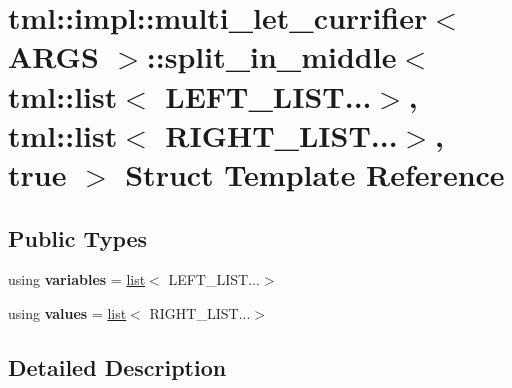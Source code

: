 \hypertarget{structtml_1_1impl_1_1multi__let__currifier_1_1split__in__middle_3_01tml_1_1list_3_01_l_e_f_t___ld9733f5c21967624b3111370412aab07}{\section{tml\+:\+:impl\+:\+:multi\+\_\+let\+\_\+currifier$<$ A\+R\+G\+S $>$\+:\+:split\+\_\+in\+\_\+middle$<$ tml\+:\+:list$<$ L\+E\+F\+T\+\_\+\+L\+I\+S\+T...$>$, tml\+:\+:list$<$ R\+I\+G\+H\+T\+\_\+\+L\+I\+S\+T...$>$, true $>$ Struct Template Reference}
\label{structtml_1_1impl_1_1multi__let__currifier_1_1split__in__middle_3_01tml_1_1list_3_01_l_e_f_t___ld9733f5c21967624b3111370412aab07}
}
\subsection*{Public Types}
\begin{DoxyCompactItemize}
\item 
\hypertarget{structtml_1_1impl_1_1multi__let__currifier_1_1split__in__middle_3_01tml_1_1list_3_01_l_e_f_t___ld9733f5c21967624b3111370412aab07_a502cd50b2f420d0bd7918955a6cc6131}{using {\bfseries variables} = \hyperlink{structtml_1_1list}{list}$<$ L\+E\+F\+T\+\_\+\+L\+I\+S\+T...$>$}\label{structtml_1_1impl_1_1multi__let__currifier_1_1split__in__middle_3_01tml_1_1list_3_01_l_e_f_t___ld9733f5c21967624b3111370412aab07_a502cd50b2f420d0bd7918955a6cc6131}

\item 
\hypertarget{structtml_1_1impl_1_1multi__let__currifier_1_1split__in__middle_3_01tml_1_1list_3_01_l_e_f_t___ld9733f5c21967624b3111370412aab07_a80bbf507599ff7d121b6c78acc3b88ba}{using {\bfseries values} = \hyperlink{structtml_1_1list}{list}$<$ R\+I\+G\+H\+T\+\_\+\+L\+I\+S\+T...$>$}\label{structtml_1_1impl_1_1multi__let__currifier_1_1split__in__middle_3_01tml_1_1list_3_01_l_e_f_t___ld9733f5c21967624b3111370412aab07_a80bbf507599ff7d121b6c78acc3b88ba}

\end{DoxyCompactItemize}


\subsection{Detailed Description}
